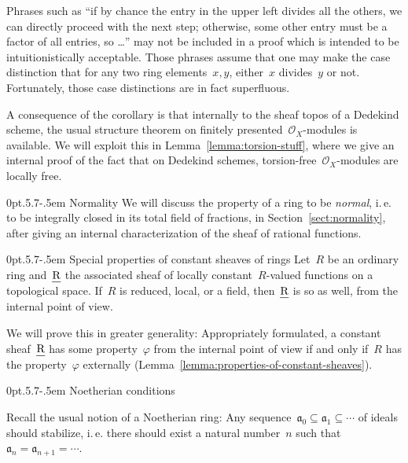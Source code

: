 \documentclass[10pt,reqno,a4paper]{amsbook}
\makeatletter
\theoremstyle{definition}
\theoremstyle{plain}
\theoremstyle{remark}
\renewcommand{\O}{\mathcal{O}}
\newcommand{\aaa}{\mathfrak{a}}
\let\oldul\ul
\renewcommand{\ul}[1]{\text{\oldul{$#1$}}}
\newcommand{\?}{\,{:}\,}
\renewcommand{\_}{\mathpunct{.}\,}
\newcommand{\ie}{i.\,e.\@\xspace}
\def\subsection{\@startsection{subsection}{2}%
  {0pt}{.5\linespacing\@plus.7\linespacing}{-.5em}%
  {\normalfont\bfseries}}
\makeatother
\begin{document}
Phrases such as ``if by chance the entry in the upper left divides
all the others, we can directly proceed with the next step; otherwise, some
other entry must be a factor of all entries, so \ldots'' may not be included in
a proof which is intended to be intuitionistically acceptable.
Those phrases assume that one may make the case distinction that for
any two ring elements~$x,y$, either~$x$ divides~$y$ or not. Fortunately, those
case distinctions are in fact superfluous.

A consequence of the corollary is that internally to the sheaf topos of a
Dedekind scheme, the usual structure theorem on finitely
presented~$\O_X$-modules is available. We will exploit this in
Lemma~\ref{lemma:torsion-stuff}, where we give an internal proof of the
fact that on Dedekind schemes, torsion-free~$\O_X$-modules are locally free.


\subsection{Normality} We will discuss the property of a ring to be
\emph{normal}, \ie to be integrally closed in its total field of
fractions, in Section~\ref{sect:normality}, after giving an internal
characterization of the sheaf of rational functions.


\subsection{Special properties of constant sheaves of rings} Let~$R$ be an
ordinary ring and~$\ul{R}$ the associated sheaf of locally constant~$R$-valued
functions on a topological space. If~$R$ is reduced, local, or a field,
then~$\ul{R}$ is so as well, from the internal point of view.

We will prove this in greater generality: Appropriately formulated, a constant
sheaf~$\ul{R}$ has some property~$\varphi$ from the internal point of view if
and only if~$R$ has the property~$\varphi$ externally
(Lemma~\ref{lemma:properties-of-constant-sheaves}).


\subsection{Noetherian conditions}
\label{sect:noetherian}

Recall the usual notion of a Noetherian ring: Any sequence~$\aaa_0 \subseteq
\aaa_1 \subseteq \cdots$ of ideals should stabilize, \ie there should exist a
natural number~$n$ such that~$\aaa_n = \aaa_{n+1} = \cdots$.
\end{document}
